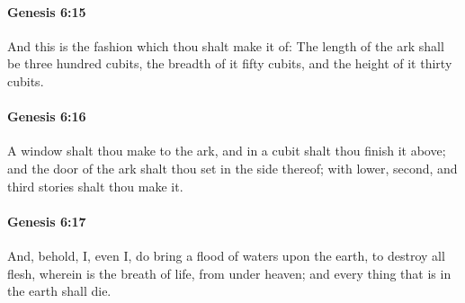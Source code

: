 		\paragraph{Genesis 6:15} %
			\label{GENESIS-6-15}

			And this is the fashion which thou shalt make it of: The length of the ark shall be three hundred cubits, the breadth of it fifty cubits, and the height of it thirty cubits.


		\paragraph{Genesis 6:16} %
			\label{GENESIS-6-16}

			A window shalt thou make to the ark, and in a cubit shalt thou finish it above; and the door of the ark shalt thou set in the side thereof; with lower, second, and third stories shalt thou make it.


		\paragraph{Genesis 6:17} %
			\label{GENESIS-6-17}

			And, behold, I, even I, do bring a flood of waters upon the earth, to destroy all flesh, wherein is the breath of life, from under heaven; and every thing that is in the earth shall die.



